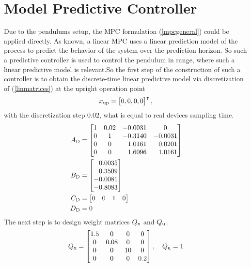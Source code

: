 \section{Model Predictive Controller}
Due to the pendulums setup, the MPC formulation (\ref{mpcgeneral}) could be applied directly. As known, a linear MPC uses a linear prediction model of the process to predict the behavior of the system over the prediction horizon. So such a predictive controller is used to control the pendulum in range, where such a linear predictive model is relevant.So the first step of the construction of such a controller is to obtain the discrete-time linear predictive model via discretization of (\ref{linmatrices}) at the upright operation point 
\begin{equation}
	x _{\text{up}} = \begin{bmatrix}0,0,0,0\end{bmatrix}^\intercal, 
\end{equation}
with the discretization step $0.02$, what is equal to real devices sampling time. 
\begin{subequations}\label{dismatrices}
	\begin{align}
	A _{\text{D}} &=\begin{bmatrix}
	1&0.02&-0.0031& 0\\
	0&1&-0.3140&-0.0031\\
	0&0&\ \; \,1.0161&\ \; \,0.0201\\
	0&0&\ \; \,1.6096&\ \; \,1.0161
	\end{bmatrix}\\
	B _{\text{D}} &=\begin{bmatrix}
	\ \; \,0.0035\\
	\ \; \,0.3509\\
	-0.0081\\
	-0.8083
	\end{bmatrix}\\
	C _{\text{D}} &= \begin{bmatrix}0&0&1&0\end{bmatrix}\\
	D _{\text{D}} &= 0
	\end{align}
\end{subequations}
The next step is to design weight matrices $Q _{\text{x}}$ and $Q _{\text{u}}$.
\begin{equation}
Q _{\text{x}} = \begin{bmatrix}
1.5&0&0&0\\
0&0.08&0&0\\
0&0&10&0\\
0&0&0&0.2
\end{bmatrix}, \quad Q _{\text{u}} = 1
\end{equation}
